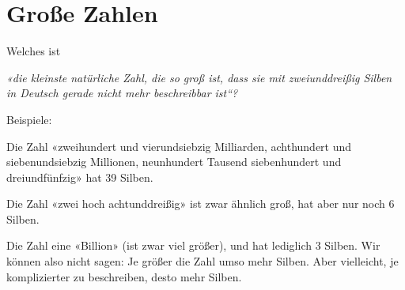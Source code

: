 \section{Große Zahlen}

Welches ist


\textit{«die kleinste natürliche Zahl, die so groß ist, dass sie mit zweiunddreißig Silben
in Deutsch gerade nicht mehr beschreibbar ist“?}


Beispiele:

Die Zahl «zweihundert und vierundsiebzig Milliarden, achthundert und
siebenundsiebzig Millionen, neunhundert Tausend siebenhundert und
dreiundfünfzig» hat 39 Silben.

Die Zahl «zwei hoch achtunddreißig» ist zwar ähnlich groß, hat aber nur noch 6
Silben.

Die Zahl eine «Billion» (ist zwar viel größer), und hat lediglich 3 Silben.
Wir können also nicht sagen: Je größer die Zahl umso mehr Silben. Aber
vielleicht, je komplizierter zu beschreiben, desto mehr Silben.

\TNTeop{}

